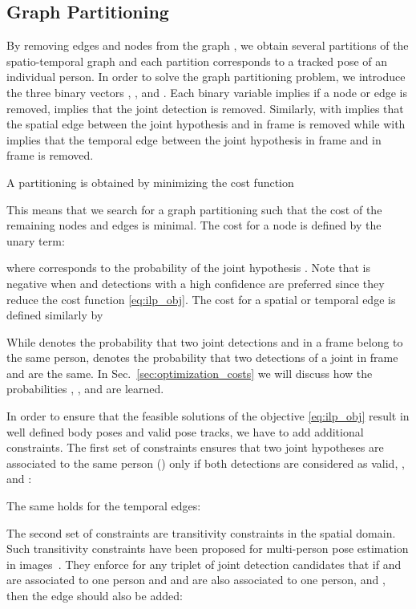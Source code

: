 \documentclass[10pt,twocolumn,letterpaper]{article}
\begin{document}
\subsection{Graph Partitioning}
\label{sec:graph-partitioning}
By removing edges and nodes from the graph \mbox{}, we obtain several partitions of the spatio-temporal graph and each partition corresponds to a tracked pose of an individual person. In order to solve the graph partitioning problem, we introduce the three binary vectors ,  , and . Each binary variable implies if a node or edge is removed, \ie  implies that the joint detection  is removed. Similarly,  with  implies that the spatial edge between the joint hypothesis  and  in frame  is removed while   
 with  implies that the temporal edge between the joint hypothesis  in frame  and  in frame  is removed.

A partitioning is obtained by minimizing the cost function  

This means that we search for a graph partitioning such that the cost of the remaining nodes and edges is minimal. The cost for a node  is defined by the unary term:  

where  corresponds to the probability of the joint hypothesis . Note that  is negative when  and detections with a high confidence are preferred since they reduce the cost function \eqref{eq:ilp_obj}. The cost for a spatial or temporal edge is defined similarly by

While  denotes the probability that two joint detections  and  in a frame  belong to the same person,  denotes the probability that two detections of a joint in frame  and  are the same. In Sec.~\ref{sec:optimization_costs} we will discuss how the probabilities , , and  are learned.  


In order to ensure that the feasible solutions of the objective \eqref{eq:ilp_obj} result in well defined body poses and valid pose tracks, we have to add additional constraints. The first set of constraints ensures that two joint hypotheses are associated to the same person () only if both detections are considered as valid, \ie,  and :  

The same holds for the temporal edges:


The second set of constraints are transitivity constraints in the spatial domain. Such transitivity constraints have been proposed for multi-person pose estimation in images~\cite{pishchulin2016deepcut, insafutdinov2016deepercut, Iqbal_ECCVw2016}. They enforce for any triplet of joint detection candidates  that if  and  are associated to one person and  and  are also associated to one person, \ie  and , then the edge  should also be added:  
\end{document}
